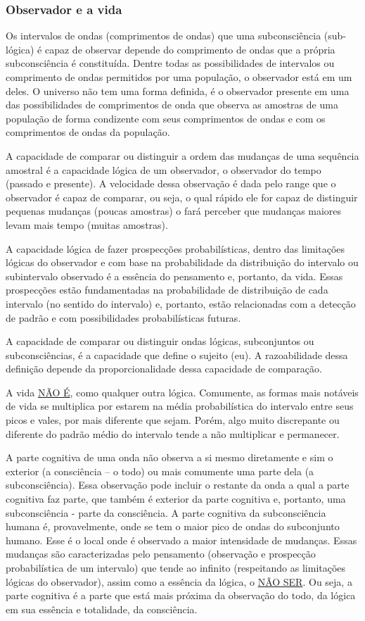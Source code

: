 \subsubsection{Observador e a vida}
Os intervalos de ondas (comprimentos de ondas) que uma subconsciência (sub-lógica) é capaz de observar depende do comprimento de ondas que a própria subconsciência é constituída. Dentre todas as possibilidades de intervalos ou comprimento de ondas permitidos por uma população, o observador está em um deles. O universo não tem uma forma definida, é o observador presente em uma das possibilidades de comprimentos de onda que observa as amostras de uma população de forma condizente com seus comprimentos de ondas e com os comprimentos de ondas da população.

A capacidade de comparar ou distinguir a ordem das mudanças de uma sequência amostral é a capacidade lógica de um observador, o observador do tempo (passado e presente). A velocidade dessa observação é dada pelo range que o observador é capaz de comparar, ou seja, o qual rápido ele for capaz de distinguir pequenas mudanças (poucas amostras) o fará perceber que mudanças maiores levam mais tempo (muitas amostras). 

A capacidade lógica de fazer prospecções probabilísticas, dentro das limitações lógicas do observador e com base na probabilidade da distribuição do intervalo ou subintervalo observado é a essência do pensamento e, portanto, da vida. Essas prospecções estão fundamentadas na probabilidade de distribuição de cada intervalo (no sentido do intervalo) e, portanto, estão relacionadas com a detecção de padrão e com possibilidades probabilísticas futuras.

A capacidade de comparar ou distinguir ondas lógicas, subconjuntos ou subconsciências, é a capacidade que define o sujeito (eu). A razoabilidade dessa definição depende da proporcionalidade dessa capacidade de comparação.

A vida \underline{NÃO É}, como qualquer outra lógica. Comumente, as formas mais notáveis de vida se multiplica por estarem na média probabilística do intervalo entre seus picos e vales, por mais diferente que sejam. Porém, algo muito discrepante ou diferente do padrão médio do intervalo tende a não multiplicar e permanecer.

A parte cognitiva de uma onda não observa a si mesmo diretamente e sim o exterior (a consciência – o todo) ou mais comumente uma parte dela (a subconsciência). Essa observação pode incluir o restante da onda a qual a parte cognitiva faz parte, que também é exterior da parte cognitiva e, portanto, uma subconsciência - parte da consciência. A parte cognitiva da subconsciência humana é, provavelmente, onde se tem o maior pico de ondas do subconjunto humano. Esse é o local onde é observado a maior intensidade de mudanças. Essas mudanças são caracterizadas pelo pensamento (observação e prospecção probabilística de um intervalo) que tende ao infinito (respeitando as limitações lógicas do observador), assim como a essência da lógica, o \underline{NÃO SER}. Ou seja, a parte cognitiva é a parte que está mais próxima da observação do todo, da lógica em sua essência e totalidade, da consciência.


